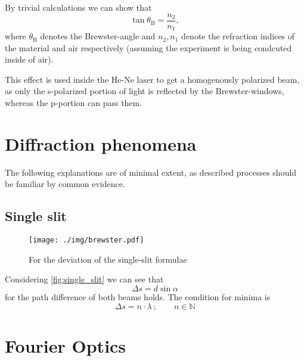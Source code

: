 By trivial calculations we can show that
\begin{equation}\label{eq:brewster}
	\tan\theta_\text{B}=\frac{n_2}{n_1},
\end{equation}
where $\theta_\text{B}$ denotes the Brewster-angle and $n_2, n_1$ denote the refraction indices of the material and air respectively (assuming the experiment is being condcuted inside of air).

This effect is used inside the He-Ne laser to get a homogenously polarized beam, as only the s-polarized portion of light is reflected by the Brewster-windows, whereas the p-portion can pass them.

\section{Diffraction phenomena}
The following explanations are of minimal extent, as described processes should be familiar by common evidence.

\subsection{Single slit}
\begin{figure}[tb]
	\centering
	\texttt{[image: ./img/brewster.pdf]}
	\caption[Single slit]{For the deviation of the single-slit formulae}
	\label{fig:single_slit}
\end{figure}

Considering \autoref{fig:single_slit} we can see that
\begin{equation*}
	\Delta s=d\sin\alpha
\end{equation*}
for the path difference of both beams holds.
The condition for minima is
\begin{equation*}
	\Delta s = n\cdot\lambda\ ;\qquad n\in\mathbb{N}
\end{equation*}
\section{Fourier Optics}
